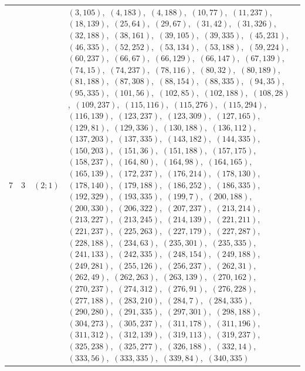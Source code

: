 \documentclass[11pt]{article}
\begin{document}
\begin{longtable}{@{}rrl>{\raggedright\arraybackslash}p{}@{}}
7 & 3 & $(2;1)$ & $(3,105)$,\allowbreak\ $(4,183)$,\allowbreak\ $(4,188)$,\allowbreak\ $(10,77)$,\allowbreak\ $(11,237)$,\allowbreak\ $(18,139)$,\allowbreak\ $(25,64)$,\allowbreak\ $(29,67)$,\allowbreak\ $(31,42)$,\allowbreak\ $(31,326)$,\allowbreak\ $(32,188)$,\allowbreak\ $(38,161)$,\allowbreak\ $(39,105)$,\allowbreak\ $(39,335)$,\allowbreak\ $(45,231)$,\allowbreak\ $(46,335)$,\allowbreak\ $(52,252)$,\allowbreak\ $(53,134)$,\allowbreak\ $(53,188)$,\allowbreak\ $(59,224)$,\allowbreak\ $(60,237)$,\allowbreak\ $(66,67)$,\allowbreak\ $(66,129)$,\allowbreak\ $(66,147)$,\allowbreak\ $(67,139)$,\allowbreak\ $(74,15)$,\allowbreak\ $(74,237)$,\allowbreak\ $(78,116)$,\allowbreak\ $(80,32)$,\allowbreak\ $(80,189)$,\allowbreak\ $(81,188)$,\allowbreak\ $(87,308)$,\allowbreak\ $(88,154)$,\allowbreak\ $(88,335)$,\allowbreak\ $(94,35)$,\allowbreak\ $(95,335)$,\allowbreak\ $(101,56)$,\allowbreak\ $(102,85)$,\allowbreak\ $(102,188)$,\allowbreak\ $(108,28)$,\allowbreak\ $(109,237)$,\allowbreak\ $(115,116)$,\allowbreak\ $(115,276)$,\allowbreak\ $(115,294)$,\allowbreak\ $(116,139)$,\allowbreak\ $(123,237)$,\allowbreak\ $(123,309)$,\allowbreak\ $(127,165)$,\allowbreak\ $(129,81)$,\allowbreak\ $(129,336)$,\allowbreak\ $(130,188)$,\allowbreak\ $(136,112)$,\allowbreak\ $(137,203)$,\allowbreak\ $(137,335)$,\allowbreak\ $(143,182)$,\allowbreak\ $(144,335)$,\allowbreak\ $(150,203)$,\allowbreak\ $(151,36)$,\allowbreak\ $(151,188)$,\allowbreak\ $(157,175)$,\allowbreak\ $(158,237)$,\allowbreak\ $(164,80)$,\allowbreak\ $(164,98)$,\allowbreak\ $(164,165)$,\allowbreak\ $(165,139)$,\allowbreak\ $(172,237)$,\allowbreak\ $(176,214)$,\allowbreak\ $(178,130)$,\allowbreak\ $(178,140)$,\allowbreak\ $(179,188)$,\allowbreak\ $(186,252)$,\allowbreak\ $(186,335)$,\allowbreak\ $(192,329)$,\allowbreak\ $(193,335)$,\allowbreak\ $(199,7)$,\allowbreak\ $(200,188)$,\allowbreak\ $(200,330)$,\allowbreak\ $(206,322)$,\allowbreak\ $(207,237)$,\allowbreak\ $(213,214)$,\allowbreak\ $(213,227)$,\allowbreak\ $(213,245)$,\allowbreak\ $(214,139)$,\allowbreak\ $(221,211)$,\allowbreak\ $(221,237)$,\allowbreak\ $(225,263)$,\allowbreak\ $(227,179)$,\allowbreak\ $(227,287)$,\allowbreak\ $(228,188)$,\allowbreak\ $(234,63)$,\allowbreak\ $(235,301)$,\allowbreak\ $(235,335)$,\allowbreak\ $(241,133)$,\allowbreak\ $(242,335)$,\allowbreak\ $(248,154)$,\allowbreak\ $(249,188)$,\allowbreak\ $(249,281)$,\allowbreak\ $(255,126)$,\allowbreak\ $(256,237)$,\allowbreak\ $(262,31)$,\allowbreak\ $(262,49)$,\allowbreak\ $(262,263)$,\allowbreak\ $(263,139)$,\allowbreak\ $(270,162)$,\allowbreak\ $(270,237)$,\allowbreak\ $(274,312)$,\allowbreak\ $(276,91)$,\allowbreak\ $(276,228)$,\allowbreak\ $(277,188)$,\allowbreak\ $(283,210)$,\allowbreak\ $(284,7)$,\allowbreak\ $(284,335)$,\allowbreak\ $(290,280)$,\allowbreak\ $(291,335)$,\allowbreak\ $(297,301)$,\allowbreak\ $(298,188)$,\allowbreak\ $(304,273)$,\allowbreak\ $(305,237)$,\allowbreak\ $(311,178)$,\allowbreak\ $(311,196)$,\allowbreak\ $(311,312)$,\allowbreak\ $(312,139)$,\allowbreak\ $(319,113)$,\allowbreak\ $(319,237)$,\allowbreak\ $(325,238)$,\allowbreak\ $(325,277)$,\allowbreak\ $(326,188)$,\allowbreak\ $(332,14)$,\allowbreak\ $(333,56)$,\allowbreak\ $(333,335)$,\allowbreak\ $(339,84)$,\allowbreak\ $(340,335)$\\

\end{longtable}
\end{document}
